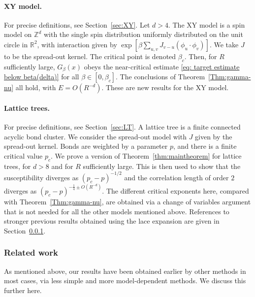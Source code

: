 \documentclass[11pt,a4paper]{article}
\numberwithin{equation}{section}
\theoremstyle{plain}
\theoremstyle{definition}
\newcommand\1{\mathds{1}}
\begin{document}
\paragraph{XY model.}
For precise definitions, see Section~\ref{sec:XY}.  Let $d>4$.
The XY model is a spin model on $\mathbb Z^d$ with the single spin distribution
uniformly distributed on the unit circle in $\mathbb R^2$, with
interaction given by $\exp[\beta\sum_{u,v}J_{v-u}(\phi_u \cdot \phi_v)]$.
We take $J$ to be the spread-out kernel.
The critical point
is denoted $\beta_c$.
Then, for $R$ sufficiently large, $G_\beta(x)$ obeys the near-critical
estimate \eqref{eq: target estimate below beta(delta)} for all $\beta \in [0,\beta_c]$.
The conclusions of Theorem~\ref{Thm:gamma-nu} all hold, with $E=O(R^{-d})$.
These are new results for the XY model.

\paragraph{Lattice trees.}
For precise definitions, see Section~\ref{sec:LT}.
A lattice tree is a finite connected acyclic bond cluster.
We consider the spread-out model with $J$ given by the spread-out kernel.
Bonds are weighted by a parameter $p$, and there is a finite critical value $p_c$.
We prove a version of Theorem~\ref{thm:maintheorem} for lattice trees,
for $d>8$ and for $R$ sufficiently large.
This is then used to show that the susceptibility diverges as
$(p_c-p)^{-1/2}$ and the correlation length of order $2$ diverges as
$(p_c-p)^{-\frac 14 \pm O(R^{-d})}$.  The different critical exponents here,
compared with Theorem~\ref{Thm:gamma-nu}, are obtained via a change
of variables argument that is not needed for all the other models mentioned
above.
References to stronger previous results obtained using the lace expansion are
given in Section~\ref{sec:previous-work}.



\subsubsection{Related work}
\label{sec:previous-work}


As mentioned above, our results have been obtained earlier by other methods
in most cases, via less simple and more model-dependent methods.
We discuss this further here.
\end{document}
